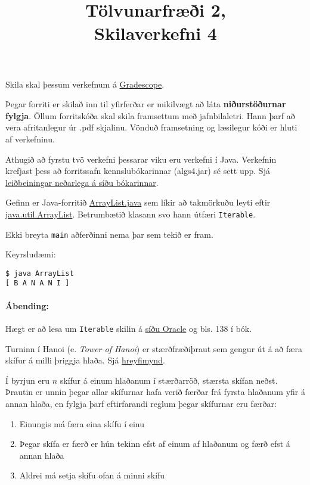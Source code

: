 \documentclass{article}
\title{Tölvunarfræði 2, \semester \\ Skilaverkefni 4}
\author{}
\begin{document}
\maketitle
{}

Skila skal þessum verkefnum á \href{https://gradescope.com/courses/14122}{Gradescope}.

Þegar forriti er skilað inn til yfirferðar er mikilvægt að láta \textbf{niðurstöðurnar fylgja}. Öllum forritskóða skal skila framsettum með jafnbilaletri. Hann þarf að vera afritanlegur úr .pdf skjalinu. Vönduð framsetning og læsilegur kóði er hluti af verkefninu.

Athugið að fyrstu tvö verkefni þessarar viku eru verkefni í Java. Verkefnin krefjast þess að forritssafn kennslubókarinnar (algs4.jar) sé sett upp. Sjá \href{http://algs4.cs.princeton.edu/code/}{leiðbeiningar neðarlega á síðu bókarinnar}.

\question

Gefinn er Java-forritið \href{https://raw.githubusercontent.com/Ernir/kennsluefni/master/T2/Code/w5/ArrayList.java}{ArrayList.java} sem líkir að takmörkuðu leyti eftir \href{https://docs.oracle.com/javase/8/docs/api/java/util/ArrayList.html}{java.util.ArrayList}.  Betrumbætið klasann svo hann útfæri \texttt{Iterable}.

Ekki breyta \texttt{main} aðferðinni nema þar sem tekið er fram.

Keyrsludæmi:

\begin{verbatim}
$ java ArrayList
[ B A N A N I ]
\end{verbatim}

\paragraph{Ábending:} Hægt er að lesa um \texttt{Iterable} skilin á \href{https://docs.oracle.com/javase/8/docs/api/java/lang/Iterable.html}{síðu Oracle} og bls. 138 í bók.

\question
Turninn í Hanoi (e. \emph{Tower of Hanoi}) er stærðfræðiþraut sem gengur út á að færa skífur á milli þriggja hlaða. Sjá \href{https://www.tutorialspoint.com/data_structures_algorithms/images/tower_of_hanoi.gif}{hreyfimynd}.

Í byrjun eru $n$ skífur á einum hlaðanum í stærðarröð, stærsta skífan neðst. Þrautin er unnin þegar allar skífurnar hafa verið færðar frá fyrsta hlaðanum yfir á annan hlaða, en fylgja þarf eftirfarandi reglum þegar skífurnar eru færðar:
\begin{enumerate}
	\item Einungis má færa eina skífu í einu
	\item Þegar skífa er færð er hún tekinn efst af einum af hlaðanum og færð efst á annan hlaða
	\item Aldrei má setja skífu ofan á minni skífu
\end{enumerate}
\end{document}
